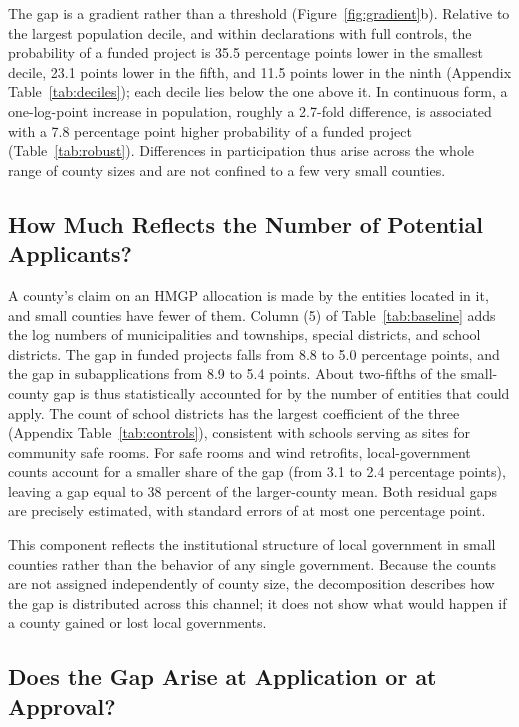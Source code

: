The gap is a gradient rather than a threshold (Figure~\ref{fig:gradient}b). Relative to the largest population decile, and within declarations with full controls, the probability of a funded project is 35.5 percentage points lower in the smallest decile, 23.1 points lower in the fifth, and 11.5 points lower in the ninth (Appendix Table~\ref{tab:deciles}); each decile lies below the one above it. In continuous form, a one-log-point increase in population, roughly a 2.7-fold difference, is associated with a 7.8 percentage point higher probability of a funded project (Table~\ref{tab:robust}). Differences in participation thus arise across the whole range of county sizes and are not confined to a few very small counties.

\subsection{How Much Reflects the Number of Potential Applicants?}
\label{sec:structure}

A county's claim on an HMGP allocation is made by the entities located in it, and small counties have fewer of them. Column (5) of Table~\ref{tab:baseline} adds the log numbers of municipalities and townships, special districts, and school districts. The gap in funded projects falls from 8.8 to 5.0 percentage points, and the gap in subapplications from 8.9 to 5.4 points. About two-fifths of the small-county gap is thus statistically accounted for by the number of entities that could apply. The count of school districts has the largest coefficient of the three (Appendix Table~\ref{tab:controls}), consistent with schools serving as sites for community safe rooms. For safe rooms and wind retrofits, local-government counts account for a smaller share of the gap (from 3.1 to 2.4 percentage points), leaving a gap equal to 38 percent of the larger-county mean. Both residual gaps are precisely estimated, with standard errors of at most one percentage point.

This component reflects the institutional structure of local government in small counties rather than the behavior of any single government. Because the counts are not assigned independently of county size, the decomposition describes how the gap is distributed across this channel; it does not show what would happen if a county gained or lost local governments.

\subsection{Does the Gap Arise at Application or at Approval?}
\label{sec:pipeline}


